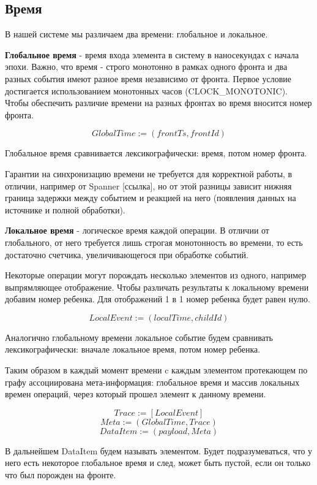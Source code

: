 \documentclass[14pt]{matmex-diploma-custom}
\begin{document}
\subsection{Время}

В нашей системе мы различаем два времени: глобальное и локальное.

\textbf{Глобальное время} - время входа элемента в систему в наносекундах с начала эпохи. Важно, что время - строго монотонно в рамках одного фронта и два разных события имеют разное время независимо от фронта. Первое условие достигается использованием  монотонных часов (CLOCK\_MONOTONIC). Чтобы обеспечить различие времени на разных фронтах во время вносится номер фронта.

\[GlobalTime := (frontTs, frontId)\]

Глобальное время сравнивается лексикографически: время, потом номер фронта.

Гарантии на синхронизацию времени не требуется для корректной работы, в отличии, например от Spanner [ссылка], но от этой разницы зависит нижняя граница задержки между событием и реакцией на него (появления данных на источнике и полной обработки).

\textbf{Локальное время} - логическое время каждой операции. В отличии от глобального, от него требуется лишь строгая монотонность во времени, то есть достаточно счетчика, увеличивающегося при обработке событий.

Некоторые операции могут порождать несколько элементов из одного, например  выпрямляющее отображение. Чтобы различать результаты к локальному времени добавим номер ребенка. Для отображений 1 в 1 номер ребенка будет равен нулю.

\[LocalEvent := (localTime, childId)\]

Аналогично глобальному времени локальное событие будем сравнивать лексикографически: вначале локальное время, потом номер ребенка.

Таким образом в каждый момент времени c каждым элементом протекающем по графу ассоциирована мета-информация: глобальное время и массив локальных времен операций, через который прошел элемент к данному времени.

\[Trace := [LocalEvent]\]
\[Meta := (GlobalTime, Trace)\]
\[DataItem := (payload, Meta)\]

В дальнейшем DataItem будем называть элементом. Будет подразумеваться, что у него есть некоторое глобальное время и след, может быть пустой, если он только что был порожден на фронте.
\end{document}
